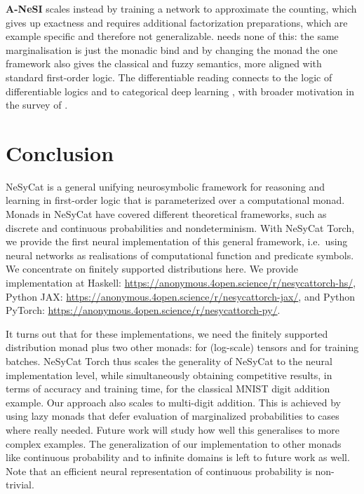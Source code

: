 \documentclass[anon]{../../journal-templates/NeSy26/nesy2026} %
\begin{document}
 \textbf{A-NeSI} \citep{kriekenANeSI2023}
scales instead by training a network to approximate the counting, which gives up exactness and requires additional factorization preparations, which are example specific and therefore not generalizable. \nesycattorch
needs none of this: the same marginalisation is just the monadic bind and by changing the monad the one framework also gives the classical and fuzzy semantics, more aligned with standard first-order logic.
 The
differentiable reading connects to the logic of differentiable logics
\citep{slusarzDifferentiableLogics2023} and to categorical deep learning
\citep{gavranovicCategoricalDeepLearning2024,fongBackpropFunctor2019}, with broader motivation in the
survey of \citet{smetDeepSeaProbLog2023}. 

\section{Conclusion}
\label{sec:conclusion}

NeSyCat is a general unifying neurosymbolic framework for reasoning and learning in first-order logic that is parameterized over a computational monad. Monads in NeSyCat have covered different theoretical frameworks, such as discrete and continuous probabilities and nondeterminism. With NeSyCat Torch, we provide the first neural implementation of this general framework, i.e.\ using neural networks as realisations of computational function and predicate symbols. We concentrate on finitely supported distributions here. We provide implementation at Haskell: \url{https://anonymous.4open.science/r/nesycattorch-hs/}, Python JAX: \url{https://anonymous.4open.science/r/nesycattorch-jax/}, and Python PyTorch: \url{https://anonymous.4open.science/r/nesycattorch-py/}.

It turns out that for these implementations, we need the finitely supported distribution monad plus two other monads: for (log-scale) tensors and for training batches. NeSyCat Torch thus scales the generality of NeSyCat to the neural implementation level, while simultaneously obtaining competitive results, in terms of accuracy and training time, for the classical MNIST digit addition example. Our approach also scales to multi-digit addition. This is achieved by using lazy monads that defer evaluation of marginalized probabilities to cases where really needed. Future work will study how well this generalises to more complex examples. 
The generalization of our implementation to other monads like continuous probability and to infinite domains is left to future work as well. Note that an efficient neural representation of continuous probability is non-trivial. 
\end{document}
